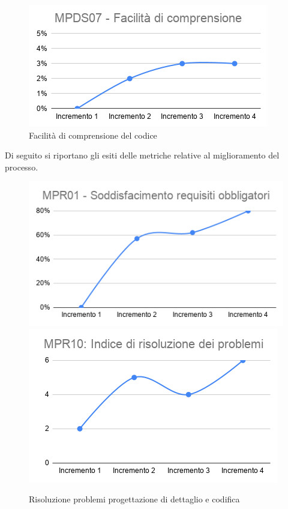 \begin{figure}[h!]
	\centering
	\includegraphics[scale=0.6]{Immagini/MPDS07_FComprensione.png}
	\caption{Facilità di comprensione del codice}
	\label{fig:FacilitàCodice}
\end{figure}

Di seguito si riportano gli esiti delle metriche relative al miglioramento del processo.
\begin{figure}[h!]
	\includegraphics[scale=0.58]{Immagini/MPR01_RObbligatori.png}\quad
	\includegraphics[scale=0.58]{Immagini/MPR10_rproblemidettaglio.png}
	\caption{Risoluzione problemi progettazione di dettaglio e codifica}
	\label{fig:MPR10codifica}
\end{figure}